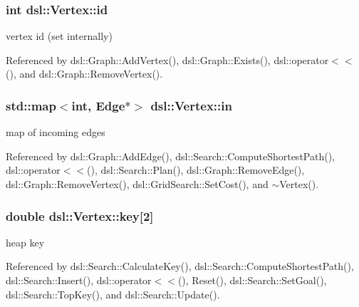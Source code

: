 \subsubsection[{id}]{\setlength{\rightskip}{0pt plus 5cm}int dsl\-::\-Vertex\-::id}\label{classdsl_1_1Vertex_ade0c7c448fddd603cdeb8d1775f3ae7a}


vertex id (set internally) 



Referenced by dsl\-::\-Graph\-::\-Add\-Vertex(), dsl\-::\-Graph\-::\-Exists(), dsl\-::operator$<$$<$(), and dsl\-::\-Graph\-::\-Remove\-Vertex().

\subsubsection[{in}]{\setlength{\rightskip}{0pt plus 5cm}std\-::map$<$int, {\bf Edge}$\ast$$>$ dsl\-::\-Vertex\-::in}\label{classdsl_1_1Vertex_a0366cdb27e1674f10b033c5cad9cfe71}


map of incoming edges 



Referenced by dsl\-::\-Graph\-::\-Add\-Edge(), dsl\-::\-Search\-::\-Compute\-Shortest\-Path(), dsl\-::operator$<$$<$(), dsl\-::\-Search\-::\-Plan(), dsl\-::\-Graph\-::\-Remove\-Edge(), dsl\-::\-Graph\-::\-Remove\-Vertex(), dsl\-::\-Grid\-Search\-::\-Set\-Cost(), and $\sim$\-Vertex().

\subsubsection[{key}]{\setlength{\rightskip}{0pt plus 5cm}double dsl\-::\-Vertex\-::key[2]\hspace{0.3cm}{\ttfamily [protected]}}\label{classdsl_1_1Vertex_a0ada3f69f585f98e0e3e4a078c979eac}


heap key 



Referenced by dsl\-::\-Search\-::\-Calculate\-Key(), dsl\-::\-Search\-::\-Compute\-Shortest\-Path(), dsl\-::\-Search\-::\-Insert(), dsl\-::operator$<$$<$(), Reset(), dsl\-::\-Search\-::\-Set\-Goal(), dsl\-::\-Search\-::\-Top\-Key(), and dsl\-::\-Search\-::\-Update().

